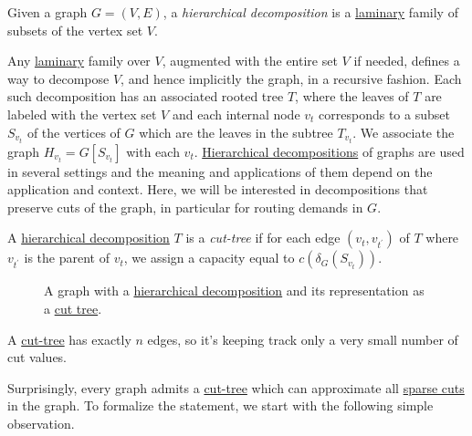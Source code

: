 \begin{definition}\label{def:hierarchical-decomposition}
	Given a graph \(G = (V, E)\), a \emph{hierarchical decomposition} is a \hyperref[def:laminary]{laminary} family of subsets of the vertex set \(V\).
\end{definition}

Any \hyperref[def:laminary]{laminary} family over \(V\), augmented with the entire set \(V\) if needed, defines a way to decompose \(V\), and hence implicitly the graph, in a recursive fashion. Each such decomposition has an associated rooted tree \(T\), where the leaves of \(T\) are labeled with the vertex set \(V\) and each internal node \(v_t\) corresponds to a subset \(S_{v_t}\) of the vertices of \(G\) which are the leaves in the subtree \(T_{v_t}\). We associate the graph \(H_{v_t} = G[S_{v_t}]\) with each \(v_t\). \hyperref[def:hierarchical-decomposition]{Hierarchical decompositions} of graphs are used in several settings and the meaning and applications of them depend on the application and context. Here, we will be interested in decompositions that preserve cuts of the graph, in particular for routing demands in \(G\).

\begin{definition}\label{def:cut-tree}
	A \hyperref[def:hierarchical-decomposition]{hierarchical decomposition} \(T\) is a \emph{cut-tree} if for each edge \((v_t, v_{t^{\prime} })\) of \(T\) where \(v_{t^{\prime} }\)  is the parent of \(v_t\), we assign a capacity equal to \(c(\delta _G(S_{v_t}))\).
\end{definition}

\begin{figure}[H]
	\centering
	\caption{A graph with a \hyperref[def:hierarchical-decomposition]{hierarchical decomposition} and its representation as a \hyperref[def:cut-tree]{cut tree}.}
	\label{fig:cut-tree}
\end{figure}

\begin{remark}
	A \hyperref[def:cut-tree]{cut-tree} has exactly \(n\) edges, so it's keeping track only a very small number of cut values.
\end{remark}

Surprisingly, every graph admits a \hyperref[def:cut-tree]{cut-tree} which can approximate all \hyperref[prb:non-uniform-sparsest-cut]{sparse cuts} in the graph. To formalize the statement, we start with the following simple observation.

